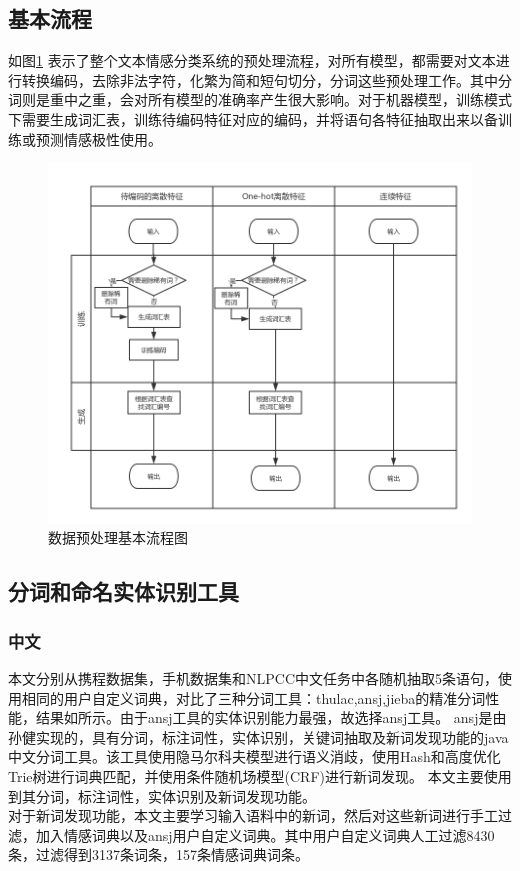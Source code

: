 \subsection{基本流程}
如图\ref{preprocessing} 表示了整个文本情感分类系统的预处理流程，对所有模型，都需要对文本进行转换编码，去除非法字符，化繁为简和短句切分，分词这些预处理工作。其中分词则是重中之重，会对所有模型的准确率产生很大影响。对于机器模型，训练模式下需要生成词汇表，训练待编码特征对应的编码，并将语句各特征抽取出来以备训练或预测情感极性使用。
\begin{figure}[!hbp]
\begin{center}
\includegraphics[width=\textwidth]{graphic/prepocessing.png}
\caption{数据预处理基本流程图 \label{preprocessing}}
\end{center}
\end{figure}

\subsection{分词和命名实体识别工具}
\subsubsection{中文}
本文分别从携程数据集，手机数据集和NLPCC中文任务中各随机抽取5条语句，使用相同的用户自定义词典，对比了三种分词工具：thulac,ansj,jieba的精准分词性能，结果如所示。由于ansj工具的实体识别能力最强，故选择ansj工具。
ansj是由孙健实现的，具有分词，标注词性，实体识别，关键词抽取及新词发现功能的java中文分词工具。该工具使用隐马尔科夫模型进行语义消歧，使用Hash和高度优化Trie树进行词典匹配，并使用条件随机场模型(CRF)进行新词发现。\cite{ansjwiki} 本文主要使用到其分词，标注词性，实体识别及新词发现功能。\\
对于新词发现功能，本文主要学习输入语料中的新词，然后对这些新词进行手工过滤，加入情感词典以及ansj用户自定义词典。其中用户自定义词典人工过滤8430条，过滤得到3137条词条，157条情感词典词条。\\
